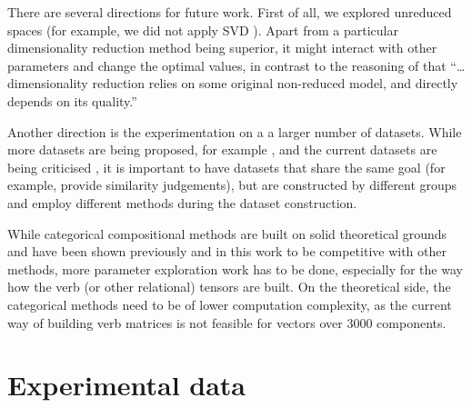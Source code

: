 \documentclass[11pt,a4paper,english,oneside]{book}
\newcommand\newcite\citet
\renewcommand\cite\citep
\begin{document}
There are several directions for future work. First of all, we explored unreduced spaces (for example, we did not apply SVD \newcite{BullinariaLevy2012}). Apart from a particular dimensionality reduction method being superior, it might interact with other parameters \cite{lapesa2014large} and change the optimal values, in contrast to the reasoning of \newcite{kiela-clark:2014:CVSC} that ``\ldots dimensionality reduction relies on some original non-reduced model, and directly depends on its quality.''

Another direction is the experimentation on a a larger number of datasets. While more datasets are being proposed, for example \newcite{2016arXiv160800869G}, and the current datasets are being criticised \cite{RepEval:2016}, it is important to have datasets that share the same goal (for example, provide similarity judgements), but are constructed by different groups and employ different methods during the dataset construction.

While categorical compositional methods are built on solid theoretical grounds \cite{DBLP:journals/corr/abs-1003-4394} and have been shown previously \cite{Grefenstette:2011:ETV:2140490.2140497,kartsadrqpl2014,fried-polajnar-clark:2015:ACL-IJCNLP,kim2015neural,hashimoto-tsuruoka:2016:P16-1} and in this work to be competitive with other methods, more parameter exploration work has to be done, especially for the way how the verb (or other relational) tensors are built. On the theoretical side, the categorical methods need to be of lower computation complexity, as the current way of building verb matrices is not feasible for vectors over 3000 components.


\cleardoublepage
{}



\cleardoublepage
\appendix

\chapter{Experimental data}









\end{document}
